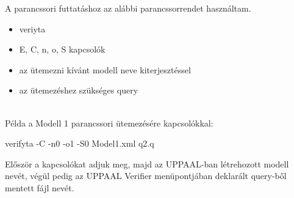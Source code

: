 \documentclass [12pt]{report}
\begin{document}
A parancssori futtatáshoz az alábbi parancssorrendet használtam.
   \begin{itemize}
	   \item {veriyta}
	   \item {E, C, n, o, S kapcsolók}
	   \item {az ütemezni kívánt modell neve kiterjesztéssel}
	   \item {az ütemezéshez szükséges query}\\\\
   \end{itemize}
   
Példa a Modell 1 parancssori ütemezésére kapcsolókkal:
\begin{center}
  verifyta -C -n0 -o1 -S0 Model1.xml q2.q\\
\end{center}
Először a kapcsolókat adjuk meg, majd az UPPAAL-ban létrehozott modell nevét, végül pedig az UPPAAL Verifier menüpontjában deklarált query-ből mentett fájl nevét.  
  
\end{document}
